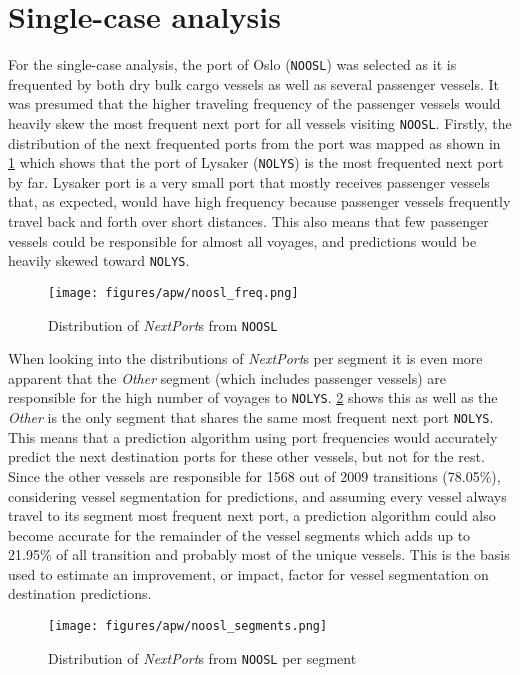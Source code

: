 \section{Single-case analysis}

For the single-case analysis, the port of Oslo (\texttt{NOOSL}) was selected as it is frequented by both dry bulk cargo vessels as well as several passenger vessels. It was presumed that the higher traveling frequency of the passenger vessels would heavily skew the most frequent next port for all vessels visiting \texttt{NOOSL}. Firstly, the distribution of the next frequented ports from the port was mapped as shown in \cref{fig:apw_noosl_freq} which shows that the port of Lysaker (\texttt{NOLYS}) is the most frequented next port by far. Lysaker port is a very small port that mostly receives passenger vessels that, as expected, would have high frequency because passenger vessels frequently travel back and forth over short distances. This also means that few passenger vessels could be responsible for almost all voyages, and predictions would be heavily skewed toward \texttt{NOLYS}.

\begin{figure}[htbp]
    \centering
    \texttt{[image: figures/apw/noosl\_freq.png]}
    \caption{Distribution of \textit{NextPort}s from \texttt{NOOSL}}
    \label{fig:apw_noosl_freq}
\end{figure}

When looking into the distributions of \textit{NextPort}s per segment it is even more apparent that the \textit{Other} segment (which includes passenger vessels) are responsible for the high number of voyages to \texttt{NOLYS}. \cref{fig:apw_noosl_segments} shows this as well as the \textit{Other} is the only segment that shares the same most frequent next port \texttt{NOLYS}. This means that a prediction algorithm using port frequencies would accurately predict the next destination ports for these other vessels, but not for the rest. Since the other vessels are responsible for 1568 out of 2009 transitions (78.05\%), considering vessel segmentation for predictions, and assuming every vessel always travel to its segment most frequent next port, a prediction algorithm could also become accurate for the remainder of the vessel segments which adds up to 21.95\% of all transition and probably most of the unique vessels. This is the basis used to estimate an improvement, or impact, factor for vessel segmentation on destination predictions.

\begin{figure}[htbp]
    \centering
    \texttt{[image: figures/apw/noosl\_segments.png]}
    \caption{Distribution of \textit{NextPort}s from \texttt{NOOSL} per segment}
    \label{fig:apw_noosl_segments}
\end{figure}

